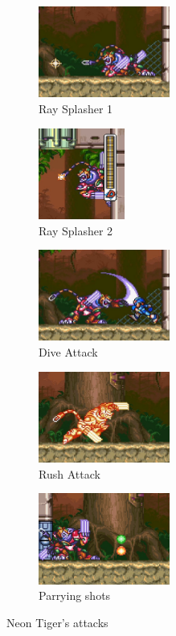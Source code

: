 \begin{figure}[htp]
	\centering
	\begin{subfigure}{.4\linewidth}
		\centering
		\includegraphics[height=3cm]{figures/X3/Neon_tiger/tiger_ray.jpg}
		\caption{Ray Splasher 1}
	\end{subfigure}
	\begin{subfigure}{.3\linewidth}
		\centering
		\includegraphics[height=3cm]{figures/X3/Neon_tiger/tiger_ray_wall.jpg}
		\caption{Ray Splasher 2}
	\end{subfigure}
	\begin{subfigure}{.4\linewidth}
		\centering
		\includegraphics[height=3cm]{figures/X3/Neon_tiger/tiger_claw.jpg}
		\caption{Dive Attack}
	\end{subfigure}
	\begin{subfigure}{.4\linewidth}
		\centering
		\includegraphics[height=3cm]{figures/X3/Neon_tiger/tiger_dm.jpg}
		\caption{Rush Attack}
	\end{subfigure}
	\begin{subfigure}{.4\linewidth}
		\centering
		\includegraphics[height=3cm]{figures/X3/Neon_tiger/tiger_guard.jpg}
		\caption{Parrying shots}
	\end{subfigure}
	\caption{Neon Tiger's attacks}
\end{figure}

